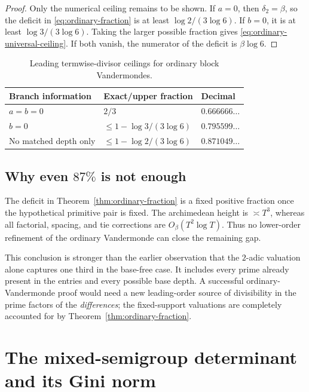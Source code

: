 \documentclass[11pt,oneside]{article}
\theoremstyle{definition}
\theoremstyle{remark}
\begin{document}
\begin{proof}
Only the numerical ceiling remains to be shown.  If $a=0$, then $\delta_2=\beta$, so the
deficit in \eqref{eq:ordinary-fraction} is at least $\log2/(3\log6)$.  If $b=0$, it is at
least $\log3/(3\log6)$.  Taking the larger possible fraction gives
\eqref{eq:ordinary-universal-ceiling}.  If both vanish, the numerator of the deficit is
$\beta\log6$.
\end{proof}

\begin{table}[ht]
\centering
\caption{Leading termwise-divisor ceilings for ordinary block Vandermondes.}
\begin{tabular}{@{}lll@{}}
\toprule
Branch information & Exact/upper fraction & Decimal\\
\midrule
$a=b=0$ & $2/3$ & $0.666666\ldots$\\
$b=0$ & $\le1-\log3/(3\log6)$ & $0.795599\ldots$\\
No matched depth only & $\le1-\log2/(3\log6)$ & $0.871049\ldots$\\
\bottomrule
\end{tabular}
\end{table}

\subsection{Why even \texorpdfstring{$87\%$}{87 percent} is not enough}

The deficit in Theorem~\ref{thm:ordinary-fraction} is a fixed positive fraction once the
hypothetical primitive pair is fixed.  The archimedean height is $\asymp T^3$, whereas all
factorial, spacing, and tie corrections are $O_\beta(T^2\log T)$.  Thus no lower-order
refinement of the ordinary Vandermonde can close the remaining gap.

This conclusion is stronger than the earlier observation that the $2$-adic valuation alone
captures one third in the base-free case.  It includes every prime already present in the
entries and every possible base depth.  A successful ordinary-Vandermonde proof would need a
new leading-order source of divisibility in the prime factors of the \emph{differences}; the
fixed-support valuations are completely accounted for by
Theorem~\ref{thm:ordinary-fraction}.

\section{The mixed-semigroup determinant and its Gini norm}
\label{sec:mixed}
\end{document}
